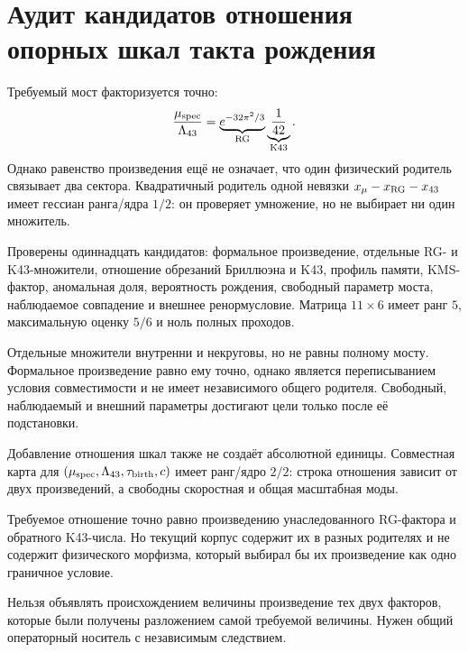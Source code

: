 \chapter{Аудит кандидатов отношения опорных шкал такта рождения}
\label{ch:v10-birth-tick-reference-scale-ratio-audit}

Требуемый мост факторизуется точно:
\begin{equation}
 \frac{\mu_{\rm spec}}{\Lambda_{43}}
 =\underbrace{e^{-32\pi^2/3}}_{\text{RG}}
 \underbrace{\frac1{42}}_{\text{K43}}.
\end{equation}
Однако равенство произведения ещё не означает, что один физический родитель
связывает два сектора. Квадратичный родитель одной невязки
$x_\mu-x_{\rm RG}-x_{43}$ имеет гессиан ранга/ядра $1/2$: он проверяет
умножение, но не выбирает ни один множитель.

Проверены одиннадцать кандидатов: формальное произведение, отдельные RG- и
K43-множители, отношение обрезаний Бриллюэна и K43, профиль памяти, KMS-
фактор, аномальная доля, вероятность рождения, свободный параметр моста,
наблюдаемое совпадение и внешнее ренормусловие. Матрица $11\times6$ имеет
ранг $5$, максимальную оценку $5/6$ и ноль полных проходов.

Отдельные множители внутренни и некруговы, но не равны полному мосту.
Формальное произведение равно ему точно, однако является переписыванием
условия совместимости и не имеет независимого общего родителя. Свободный,
наблюдаемый и внешний параметры достигают цели только после её подстановки.

Добавление отношения шкал также не создаёт абсолютной единицы. Совместная
карта для $(\mu_{\rm spec},\Lambda_{43},\tau_{\rm birth},c)$ имеет
ранг/ядро $2/2$: строка отношения зависит от двух произведений, а свободны
скоростная и общая масштабная моды.

\begin{theorem}
Требуемое отношение точно равно произведению унаследованного RG-фактора и
обратного K43-числа. Но текущий корпус содержит их в разных родителях и не
содержит физического морфизма, который выбирал бы их произведение как одно
граничное условие.
\end{theorem}

\begin{nogocriterion}
Нельзя объявлять происхождением величины произведение тех двух факторов,
которые были получены разложением самой требуемой величины. Нужен общий
операторный носитель с независимым следствием.
\end{nogocriterion}

